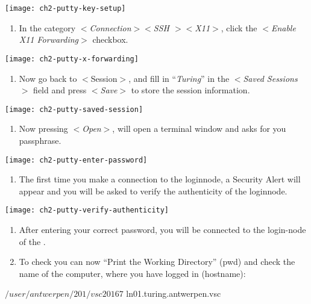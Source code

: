   \texttt{[image: ch2-putty-key-setup]}

  \begin{enumerate}
    \item  In the category $<$\emph{Connection$>$$<$SSH $>$$<$X11$>$}, click
      the $<$\emph{Enable X11 Forwarding}$>$ checkbox.
  \end{enumerate}

  \texttt{[image: ch2-putty-x-forwarding]}

  \begin{enumerate}
    \item  Now go back to $<$Session$>$, and fill in ``\emph{Turing}'' in the
      $<$\emph{Saved Sessions}$>$ field and press $<$\emph{Save}$>$ to
      store the session information.
  \end{enumerate}

  \texttt{[image: ch2-putty-saved-session]}

  \begin{enumerate}
    \item  Now pressing $<$\emph{Open}$>$, will open a terminal window and
      asks for you passphrase.
  \end{enumerate}

  \texttt{[image: ch2-putty-enter-password]}

  \begin{enumerate}
    \item  The first time you make a connection to the loginnode, a Security
      Alert will appear and you will be asked to verify the authenticity of the
      loginnode.
  \end{enumerate}

  \texttt{[image: ch2-putty-verify-authenticity]}

  \begin{enumerate}
    \item  After entering your correct password, you will be connected to the
      login-node of the \hpc.
    \item  To check you can now ``Print the Working Directory'' (pwd) and check
      the name of the computer, where you have logged in (hostname):
  \end{enumerate}

  \begin{prompt}
  $ %
  /user/antwerpen/201/vsc20167
  $ %
  ln01.turing.antwerpen.vsc
  \end{prompt}


